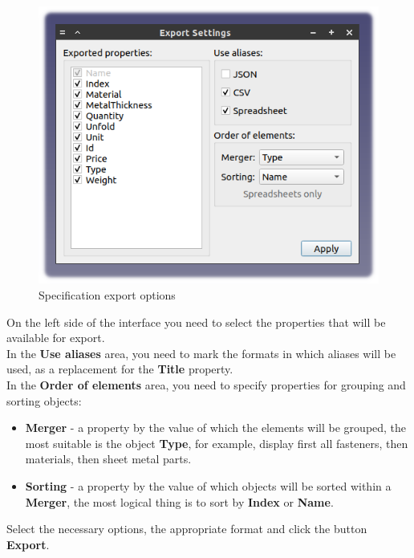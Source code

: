 \documentclass[a4paper,12pt]{article}
\begin{document}
\begin{figure}[htp]
\centering
\includegraphics[scale=0.8]{img/specification_export.png}
\caption{Specification export options}
\label{sec:specification_export}
\end{figure}

On the left side of the interface you need to select the properties that will be available for export.\\

In the \textbf{Use aliases} area, you need to mark the formats in which aliases will be used, as a replacement for the \textbf{Title} property.\\

In the \textbf{Order of elements} area, you need to specify properties for grouping and sorting objects:

\begin{itemize}
	\item \textbf{Merger} - a property by the value of which the elements will be grouped, the most suitable is the object \textbf{Type}, for example, display first all fasteners, then materials, then sheet metal parts.
	\item \textbf{Sorting} - a property by the value of which objects will be sorted within a \textbf{Merger}, the most logical thing is to sort by \textbf{Index} or \textbf{Name}.
\end{itemize}

\pagebreak

Select the necessary options, the appropriate format and click the button \textbf{Export}.
\end{document}

